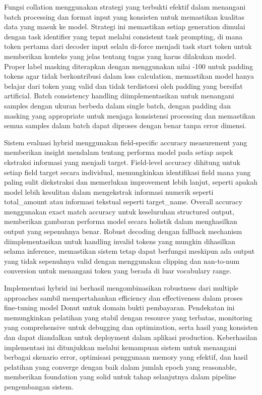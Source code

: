 Fungsi collation menggunakan strategi yang terbukti efektif dalam menangani batch processing dan format input yang konsisten untuk memastikan kualitas data yang masuk ke model. Strategi ini memastikan setiap generation dimulai dengan task identifier yang tepat melalui consistent task prompting, di mana token pertama dari decoder input selalu di-force menjadi task start token untuk memberikan konteks yang jelas tentang tugas yang harus dilakukan model. Proper label masking diterapkan dengan menggunakan nilai -100 untuk padding tokens agar tidak berkontribusi dalam loss calculation, memastikan model hanya belajar dari token yang valid dan tidak terdistorsi oleh padding yang bersifat artificial. Batch consistency handling diimplementasikan untuk menangani samples dengan ukuran berbeda dalam single batch, dengan padding dan masking yang appropriate untuk menjaga konsistensi processing dan memastikan semua samples dalam batch dapat diproses dengan benar tanpa error dimensi.

Sistem evaluasi hybrid menggunakan field-specific accuracy measurement yang memberikan insight mendalam tentang performa model pada setiap aspek ekstraksi informasi yang menjadi target. Field-level accuracy dihitung untuk setiap field target secara individual, memungkinkan identifikasi field mana yang paling sulit diekstraksi dan memerlukan improvement lebih lanjut, seperti apakah model lebih kesulitan dalam mengekstrak informasi numerik seperti total\_amount atau informasi tekstual seperti target\_name. Overall accuracy menggunakan exact match accuracy untuk keseluruhan structured output, memberikan gambaran performa model secara holistik dalam menghasilkan output yang sepenuhnya benar. Robust decoding dengan fallback mechanism diimplementasikan untuk handling invalid tokens yang mungkin dihasilkan selama inference, memastikan sistem tetap dapat berfungsi meskipun ada output yang tidak sepenuhnya valid dengan menggunakan clipping dan nan-to-num conversion untuk menangani token yang berada di luar vocabulary range.

Implementasi hybrid ini berhasil mengombinasikan robustness dari multiple approaches sambil mempertahankan efficiency dan effectiveness dalam proses fine-tuning model Donut untuk domain bukti pembayaran. Pendekatan ini memungkinkan pelatihan yang stabil dengan resource yang terbatas, monitoring yang comprehensive untuk debugging dan optimization, serta hasil yang konsisten dan dapat diandalkan untuk deployment dalam aplikasi production. Keberhasilan implementasi ini ditunjukkan melalui kemampuan sistem untuk menangani berbagai skenario error, optimisasi penggunaan memory yang efektif, dan hasil pelatihan yang converge dengan baik dalam jumlah epoch yang reasonable, memberikan foundation yang solid untuk tahap selanjutnya dalam pipeline pengembangan sistem.

